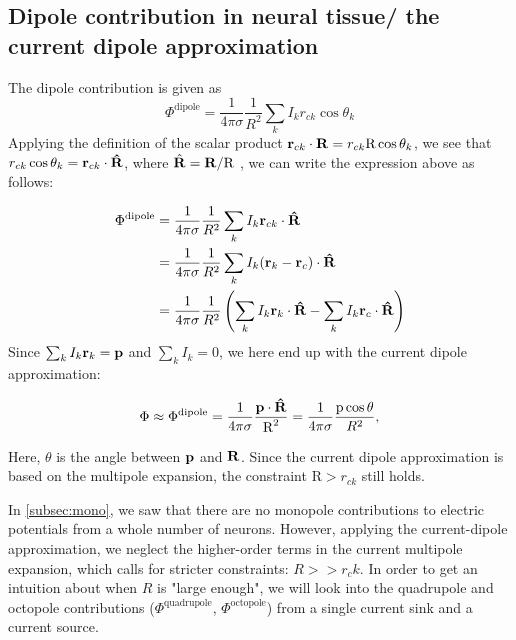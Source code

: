 \subsection{Dipole contribution in neural tissue/ the current dipole approximation}
The dipole contribution is given as 
\begin{equation*}
\Phi^{\mathrm{dipole}} = \frac{1}{4 \pi \sigma} \frac{1}{R^2} \sum_k I_k r_{ck} \cos \theta_k
\end{equation*}
Applying the definition of the scalar product ${\bf r}_{ck} \cdot {\bf R} = r_{ck} \text{R} \cos \theta_k$, we see that $r_{ck} \cos \theta_k = {\bf r}_{ck} \cdot {\bf \hat{R}}$, where $\hat{{\bf R}} = {\bf R}/\text{R}$ , we can write the expression above as follows:

\begin{align*}
\Phi^{\mathrm{dipole}} &= \frac{1}{4 \pi \sigma} \frac{1}{R^2} \sum_k I_k {\bf r}_{ck} \cdot {\bf \hat{R}} \\
		   &= \frac{1}{4 \pi \sigma} \frac{1}{R^2} \sum_k I_k ({\bf r}_{k} - {\bf r}_{c}) \cdot {\bf \hat{R}} \\
 		   &= \frac{1}{4 \pi \sigma} \frac{1}{R^2} \left(\sum_k I_k {\bf r}_{k} \cdot {\bf \hat{R}} - \sum_k I_k {\bf r}_{c} \cdot {\bf \hat{R}} \right)
\end{align*}
Since $\sum_k I_k {\bf r}_k = {\bf p}$ and $\sum_k I_k = 0$, we here end up with the current dipole approximation:

\begin{equation}
\Phi \approx \Phi^{\mathrm{dipole}} = \frac{1}{4 \pi \sigma} \frac{{\bf p} \cdot {\bf \hat{R}}}{\text{R}^2} = \frac{1}{4 \pi \sigma} \frac{\text{p} \cos \theta}{R^2},
\end{equation}

Here, $\theta$ is the angle between ${\bf p}$ and ${\bf R}$. Since the current dipole approximation is based on the multipole expansion, the constraint $\text{R} > r_{ck}$ still holds.

In \ref{subsec:mono}, we saw that there are no monopole contributions to electric potentials from a whole number of neurons. However, applying the current-dipole approximation, we neglect the higher-order terms in the current multipole expansion, which calls for stricter constraints: $R >> r_ck$. In order to get an intuition about when $R$ is "large enough", we will look into the quadrupole and octopole contributions ($\Phi^{\mathrm{quadrupole}}$, $\Phi^{\mathrm{octopole}}$) from a single current sink and a current source.

